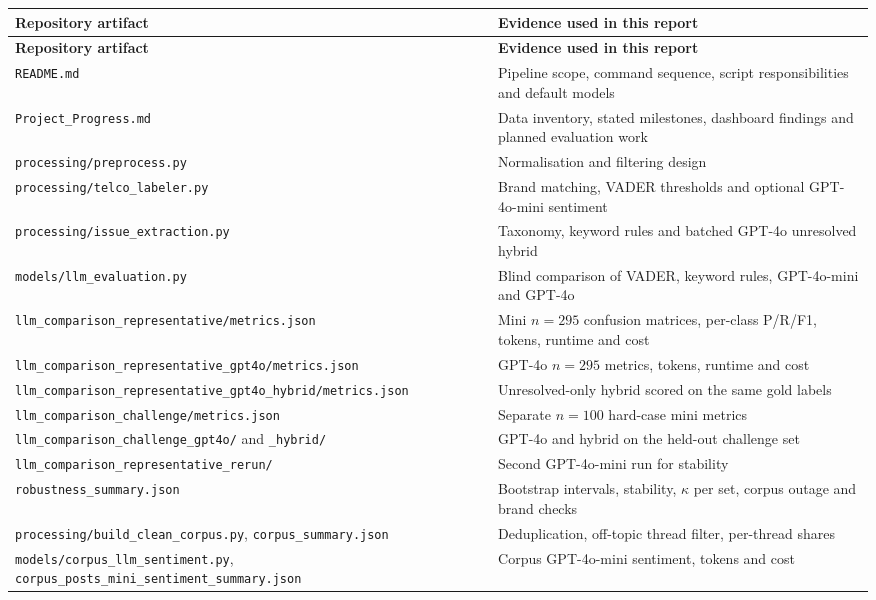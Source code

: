 \documentclass[11pt,a4paper]{article}
\begin{document}
\begin{longtable}{@{}p{}p{}@{}}
\toprule
\textbf{Repository artifact} & \textbf{Evidence used in this report} \\
\midrule
\endfirsthead
\toprule
\textbf{Repository artifact} & \textbf{Evidence used in this report} \\
\midrule
\endhead
\texttt{README.md} & Pipeline scope, command sequence, script responsibilities and default models \\
\texttt{Project\_Progress.md} & Data inventory, stated milestones, dashboard findings and planned evaluation work \\
\texttt{processing/preprocess.py} & Normalisation and filtering design \\
\texttt{processing/telco\_labeler.py} & Brand matching, VADER thresholds and optional GPT-4o-mini sentiment \\
\texttt{processing/issue\_extraction.py} & Taxonomy, keyword rules and batched GPT-4o unresolved hybrid \\
\texttt{models/llm\_evaluation.py} & Blind comparison of VADER, keyword rules, GPT-4o-mini and GPT-4o \\
\texttt{llm\_comparison\_representative/metrics.json} & Mini $n=295$ confusion matrices, per-class P/R/F1, tokens, runtime and cost \\
\texttt{llm\_comparison\_representative\_gpt4o/metrics.json} & GPT-4o $n=295$ metrics, tokens, runtime and cost \\
\texttt{llm\_comparison\_representative\_gpt4o\_hybrid/metrics.json} & Unresolved-only hybrid scored on the same gold labels \\
\texttt{llm\_comparison\_challenge/metrics.json} & Separate $n=100$ hard-case mini metrics \\
\texttt{llm\_comparison\_challenge\_gpt4o/} and \texttt{\_hybrid/} & GPT-4o and hybrid on the held-out challenge set \\
\texttt{llm\_comparison\_representative\_rerun/} & Second GPT-4o-mini run for stability \\
\texttt{robustness\_summary.json} & Bootstrap intervals, stability, $\kappa$ per set, corpus outage and brand checks \\
\texttt{processing/build\_clean\_corpus.py}, \texttt{corpus\_summary.json} & Deduplication, off-topic thread filter, per-thread shares \\
\texttt{models/corpus\_llm\_sentiment.py}, \texttt{corpus\_posts\_mini\_sentiment\_summary.json} & Corpus GPT-4o-mini sentiment, tokens and cost \\

\end{longtable}
\end{document}
